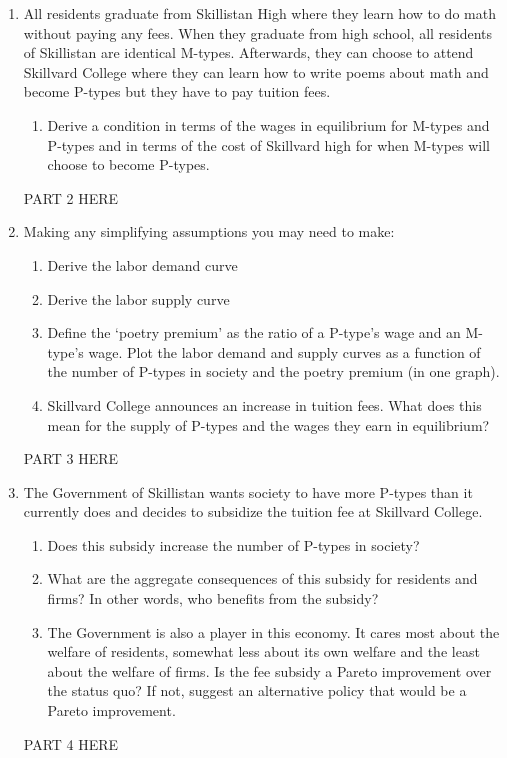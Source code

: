 \documentclass[12pt]{article}
\begin{document}
\begin{enumerate}
	\item{All residents graduate from Skillistan High where they learn how to do math without
paying any fees. When they graduate from high school, all residents of Skillistan are
identical M-types. Afterwards, they can choose to attend Skillvard College where
they can learn how to write poems about math and become P-types but they have
to pay tuition fees.}

\begin{enumerate}

	\item{Derive a condition in terms of the wages in equilibrium for M-types and P-types
and in terms of the cost of Skillvard high for when M-types will choose to become
P-types.}

\end{enumerate}

PART 2 HERE

	\item{Making any simplifying assumptions you may need to make:}
	
\begin{enumerate}

	\item{Derive the labor demand curve}
	\item{Derive the labor supply curve}
	\item{Define the `poetry premium’ as the ratio of a P-type’s wage and an M-type’s
wage. Plot the labor demand and supply curves as a function of the number of
P-types in society and the poetry premium (in one graph).}
	\item{Skillvard College announces an increase in tuition fees. What does this mean
for the supply of P-types and the wages they earn in equilibrium?}

\end{enumerate}

PART 3 HERE

	\item{The Government of Skillistan wants society to have more P-types than it currently
does and decides to subsidize the tuition fee at Skillvard College.}

\begin{enumerate}

	\item{Does this subsidy increase the number of P-types in society?}
	\item{What are the aggregate consequences of this subsidy for residents and firms? In
other words, who benefits from the subsidy?}
	\item{The Government is also a player in this economy. It cares most about the welfare
of residents, somewhat less about its own welfare and the least about the
welfare of firms. Is the fee subsidy a Pareto improvement over the status quo?
If not, suggest an alternative policy that would be a Pareto improvement.}

\end{enumerate}

PART 4 HERE


\end{enumerate}
\end{document}
